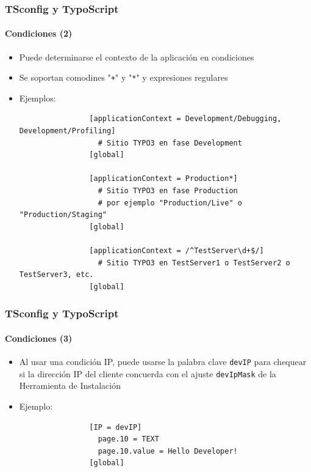 \begin{frame}[fragile]
	\frametitle{TSconfig y TypoScript}
	\framesubtitle{Condiciones (2)}

	\begin{itemize}
		\item Puede determinarse el contexto de la aplicación en condiciones
		\item Se soportan comodines "\texttt{+}" y "\texttt{*}" y expresiones regulares
		\item Ejemplos:

			\lstset{
				basicstyle=\tiny\ttfamily
			}

			\begin{lstlisting}
				[applicationContext = Development/Debugging, Development/Profiling]
				  # Sitio TYPO3 en fase Development
				[global]

				[applicationContext = Production*]
				  # Sitio TYPO3 en fase Production
				  # por ejemplo "Production/Live" o "Production/Staging"
				[global]

				[applicationContext = /^TestServer\d+$/]
				  # Sitio TYPO3 en TestServer1 o TestServer2 o TestServer3, etc.
				[global]
			\end{lstlisting}

	\end{itemize}

\end{frame}


\begin{frame}[fragile]
	\frametitle{TSconfig y TypoScript}
	\framesubtitle{Condiciones (3)}

	\begin{itemize}

		\item Al usar una condición IP, puede usarse la palabra clave \texttt{devIP} para chequear si la dirección IP del cliente concuerda con el ajuste \texttt{devIpMask} de la Herramienta de Instalación
		\item Ejemplo:


			\begin{lstlisting}
				[IP = devIP]
				  page.10 = TEXT
				  page.10.value = Hello Developer!
				[global]
			\end{lstlisting}

	\end{itemize}

\end{frame}

